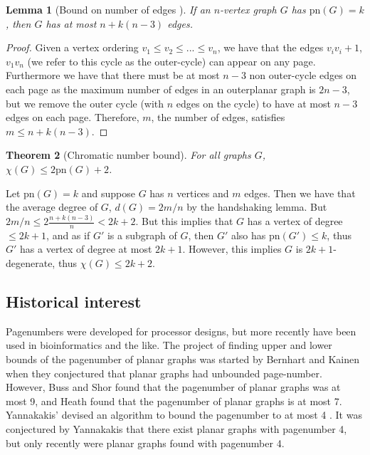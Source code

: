 \documentclass[]{article}
\newcommand{\pn}{\text{pn}}
\newtheorem{theorem}{Theorem}
\newtheorem{lemma}[theorem]{Lemma}
\theoremstyle{definition}
\numberwithin{theorem}{section}
\numberwithin{equation}{section}
\begin{document}
\begin{lemma}[Bound on number of edges \cite{bernhartBookThicknessGraph1979}]\label{lem:Edge_Bound}
	If an $n$-vertex graph $G$ has $\pn(G) = k$, then $G$ has at most $n + k(n-3)$ edges.
\end{lemma}
\begin{proof}
	Given a vertex ordering $v_1 \leq v_2 \leq ... \leq v_n$, we have that the edges $v_i v_i+1$, $v_1 v_n$ (we refer to this cycle as the outer-cycle) can appear on any page. Furthermore we have that there must be at most $n-3$ non outer-cycle edges on each page as the maximum number of edges in an outerplanar graph is $2n - 3$, but we remove the outer cycle (with $n$ edges on the cycle) to have at most $n-3$ edges on each page. Therefore, $m$, the number of edges, satisfies $m \leq n + k (n - 3)$. 
\end{proof}
\begin{theorem}[Chromatic number bound]\label{thm:Colouring_Bound}
	For all graphs $G$, $\chi(G) \leq 2 \pn(G) + 2$.
\end{theorem}
Let $\pn(G) = k$ and suppose $G$ has $n$ vertices and $m$ edges. Then we have that the average degree of $G$, $d(G) = 2m/n$ by the handshaking lemma. But $2m/n \leq 2 \frac{n + k(n-3)}{n} < 2k + 2$. But this implies that $G$ has a vertex of degree $\leq 2k + 1$, and as if $G'$ is a subgraph of $G$, then $G'$ also has $\pn(G') \leq k$, thus $G'$ has a vertex of degree at most $2k + 1$. However, this implies $G$ is $2k + 1$-degenerate, thus $\chi(G) \leq 2k + 2$. 

\subsection{Historical interest}\label{ssec:Pagenumber_History}
Pagenumbers were developed for processor designs, but more recently have been used in bioinformatics and the like. 
The project of finding upper and lower bounds of the pagenumber of planar graphs was started by Bernhart and Kainen when they conjectured that planar graphs had unbounded page-number. However, Buss and Shor\cite{bussPagenumberPlanarGraphs1984} found that the pagenumber of planar graphs was at most 9, and Heath \cite{heathEmbeddingPlanarGraphs1984} found that the pagenumber of planar graphs is at most 7. Yannakakis' devised an algorithm to bound the pagenumber to at most 4 \cite{yannakakisEmbeddingPlanarGraphs1989}. It was conjectured by Yannakakis that there exist planar graphs with pagenumber 4, but only recently were planar graphs found with pagenumber 4\cite{yannakakisPlanarGraphsThat2020}\cite{bekosFourPagesAre2020}. 
\end{document}
